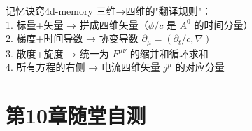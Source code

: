 \documentclass[11pt,a4paper,openany,oneside]{book}
\newcommand{\grad}{\nabla}
\begin{document}
\begin{tip}{记忆诀窍}{4d-memory}
三维→四维的"翻译规则"：\\
1. 标量+矢量 → 拼成四维矢量（$\phi/c$ 是 $A^0$ 的时间分量）\\
2. 梯度+时间导数 → 协变导数 $\partial_\mu = (\partial_t/c, \grad)$\\
3. 散度+旋度 → 统一为 $F^{\mu\nu}$ 的缩并和循环求和\\
4. 所有方程的右侧 → 电流四维矢量 $j^\mu$ 的对应分量
\end{tip}

\section*{第10章随堂自测}
\end{document}
